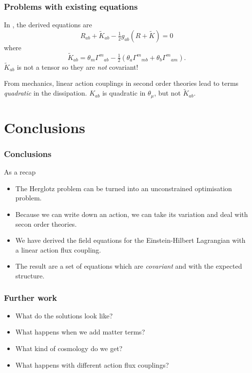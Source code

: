 \documentclass[xcolor=dvipsnames]{beamer}
\begin{document}
\begin{frame}
	\frametitle{Problems with existing equations}
	In \cite{Lazo2017}, the derived equations are
	\begin{equation*}
		R_{ab} + \tilde{K}_{ab} - \tfrac{1}{2}g_{ab}(R + \tilde{K}) = 0
	\end{equation*}
	where
	\begin{equation*}
		\tilde{K}_{ab} = \theta_m {\Gamma^m}_{ab} - \tfrac{1}{2}\left(\theta_a {\Gamma^m}_{mb} +
		\theta_b {\Gamma^m}_{am}\right). 
	\end{equation*}
	\pause \( \tilde{K}_{ab} \) is not a tensor so they are \emph{not} covariant!

	\pause From mechanics, linear action couplings in second order theories lead to terms
	\emph{quadratic} in the dissipation. \( K_{ab} \) is quadratic in	\( \theta_\mu \), but
	not \( \tilde{K}_{ab} \). 
\end{frame}

\section{Conclusions}
\begin{frame}
	\frametitle{Conclusions}
	As a recap \pause
	\begin{itemize}
		\item The Herglotz problem can be turned into an unconstrained optimisation problem.
			\pause
		\item Because we can write down an action, we can take its variation and deal with
			secon order theories. \pause
		\item We have derived the field equations for the Einstein-Hilbert Lagrangian with a
			linear action flux coupling. \pause 
		\item The result are a set of equations which are \emph{covariant} and with the
			expected structure. \pause
	\end{itemize}
\end{frame}

\begin{frame}
	\frametitle{Further work}
	\pause
	\begin{itemize}
		\item What do the solutions look like? \pause
		\item What happens when we add matter terms? \pause
		\item What kind of cosmology do we get? \pause
		\item What happens with different action flux couplings? \pause
	\end{itemize}
\end{frame}
\end{document}
